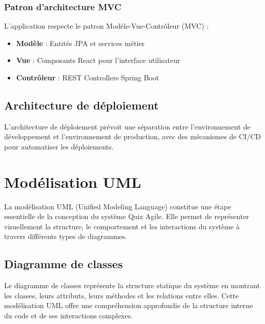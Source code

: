 \documentclass[12pt,a4paper]{report}
\begin{document}
\subsubsection{Patron d'architecture MVC}

L'application respecte le patron Modèle-Vue-Contrôleur (MVC) :

\begin{itemize}
    \item \textbf{Modèle} : Entités JPA et services métier
    \item \textbf{Vue} : Composants React pour l'interface utilisateur
    \item \textbf{Contrôleur} : REST Controllers Spring Boot
\end{itemize}

\subsection{Architecture de déploiement}

L'architecture de déploiement prévoit une séparation entre l'environnement de développement et l'environnement de production, avec des mécanismes de CI/CD pour automatiser les déploiements.

\section{Modélisation UML}

La modélisation UML (Unified Modeling Language) constitue une étape essentielle de la conception du système Quiz Agile. Elle permet de représenter visuellement la structure, le comportement et les interactions du système à travers différents types de diagrammes.

\subsection{Diagramme de classes}

Le diagramme de classes représente la structure statique du système en montrant les classes, leurs attributs, leurs méthodes et les relations entre elles. Cette modélisation UML offre une compréhension approfondie de la structure interne du code et de ses interactions complexes.
\end{document}
